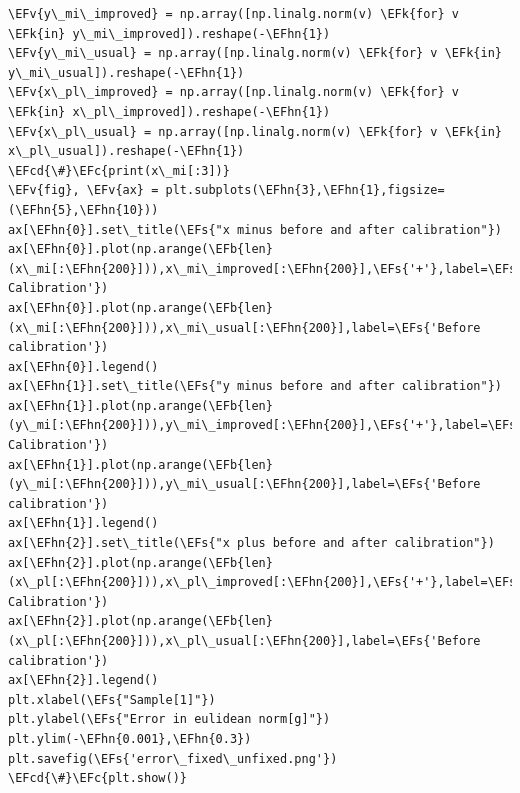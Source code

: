 \documentclass[11pt]{article}
\newcommand{\EFc}[1]{\textcolor{EFc}{#1}} %
\newcommand{\EFcd}[1]{\textcolor{EFcd}{#1}} %
\newcommand{\EFs}[1]{\textcolor{EFs}{#1}} %
\newcommand{\EFk}[1]{\textcolor{EFk}{#1}} %
\newcommand{\EFb}[1]{\textcolor{EFb}{#1}} %
\newcommand{\EFv}[1]{\textcolor{EFv}{#1}} %
\newcommand{\EFhn}[1]{\textcolor{EFhn}{#1}} %
\begin{document}
\begin{Code}
\begin{Verbatim}
\EFv{y\_mi\_improved} = np.array([np.linalg.norm(v) \EFk{for} v \EFk{in} y\_mi\_improved]).reshape(-\EFhn{1})
\EFv{y\_mi\_usual} = np.array([np.linalg.norm(v) \EFk{for} v \EFk{in} y\_mi\_usual]).reshape(-\EFhn{1})
\EFv{x\_pl\_improved} = np.array([np.linalg.norm(v) \EFk{for} v \EFk{in} x\_pl\_improved]).reshape(-\EFhn{1})
\EFv{x\_pl\_usual} = np.array([np.linalg.norm(v) \EFk{for} v \EFk{in} x\_pl\_usual]).reshape(-\EFhn{1})
\EFcd{\#}\EFc{print(x\_mi[:3])}
\EFv{fig}, \EFv{ax} = plt.subplots(\EFhn{3},\EFhn{1},figsize=(\EFhn{5},\EFhn{10}))
ax[\EFhn{0}].set\_title(\EFs{"x minus before and after calibration"})
ax[\EFhn{0}].plot(np.arange(\EFb{len}(x\_mi[:\EFhn{200}])),x\_mi\_improved[:\EFhn{200}],\EFs{'+'},label=\EFs{'After Calibration'})
ax[\EFhn{0}].plot(np.arange(\EFb{len}(x\_mi[:\EFhn{200}])),x\_mi\_usual[:\EFhn{200}],label=\EFs{'Before calibration'})
ax[\EFhn{0}].legend()
ax[\EFhn{1}].set\_title(\EFs{"y minus before and after calibration"})
ax[\EFhn{1}].plot(np.arange(\EFb{len}(y\_mi[:\EFhn{200}])),y\_mi\_improved[:\EFhn{200}],\EFs{'+'},label=\EFs{'After Calibration'})
ax[\EFhn{1}].plot(np.arange(\EFb{len}(y\_mi[:\EFhn{200}])),y\_mi\_usual[:\EFhn{200}],label=\EFs{'Before calibration'})
ax[\EFhn{1}].legend()
ax[\EFhn{2}].set\_title(\EFs{"x plus before and after calibration"})
ax[\EFhn{2}].plot(np.arange(\EFb{len}(x\_pl[:\EFhn{200}])),x\_pl\_improved[:\EFhn{200}],\EFs{'+'},label=\EFs{'After Calibration'})
ax[\EFhn{2}].plot(np.arange(\EFb{len}(x\_pl[:\EFhn{200}])),x\_pl\_usual[:\EFhn{200}],label=\EFs{'Before calibration'})
ax[\EFhn{2}].legend()
plt.xlabel(\EFs{"Sample[1]"})
plt.ylabel(\EFs{"Error in eulidean norm[g]"})
plt.ylim(-\EFhn{0.001},\EFhn{0.3})
plt.savefig(\EFs{'error\_fixed\_unfixed.png'})
\EFcd{\#}\EFc{plt.show()}
    
\end{Verbatim}
\end{Code}
\end{document}
